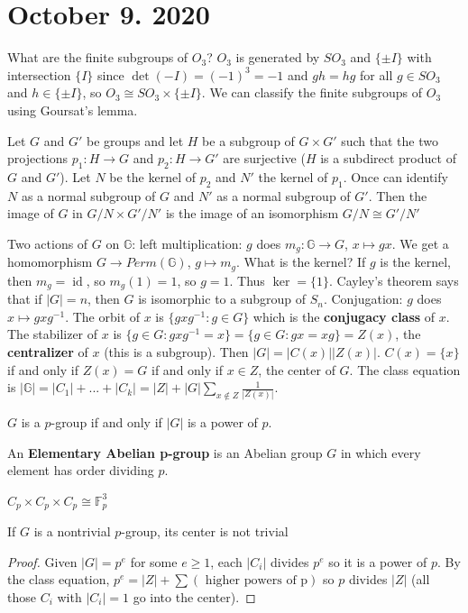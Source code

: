 \documentclass{article}
\newcommand{\vocab}[1]{\textbf{\color{blue!90}\boldmath #1}}
\newcommand{\ra}[1][]{\xrightarrow{#1}}
\DeclareMathOperator{\id}{id}
\begin{document}
\section{October 9. 2020}
What are the finite subgroups of $O_3$? $O_3$ is generated by $SO_3$ and $\{\pm I\}$ with intersection $\{I\}$ since $\det(-I)=(-1)^3=-1$ and $gh=hg$ for all $g\in SO_3$ and $h\in\{\pm I\}$, so $O_3\cong SO_3\times \{\pm I\}$. We can classify the finite subgroups of $O_3$ using Goursat's lemma.
\begin{lemma}
Let $G$ and $G'$ be groups and let $H$ be a subgroup of $G\times G'$ such that the two projections $p_1:H\ra G$ and $p_2:H\ra G'$ are surjective ($H$ is a subdirect product of $G$ and $G'$). Let $N$ be the kernel of $p_2$ and $N'$ the kernel of $p_1$. Once can identify $N$ as a normal subgroup of $G$ and $N'$ as a normal subgroup of $G'$. Then the image of $G$ in $G/N\times G'/N'$ is the image of an isomorphism $G/N\cong G'/N'$ 
\end{lemma}
Two actions of $G$ on $\mathbb{G}$: left multiplication: $g$ does $m_g:\mathbb{G}\ra G$, $x\mapsto gx$. We get a homomorphism $G\ra Perm(\mathbb{G})$, $g\mapsto m_g$. What is the kernel? If $g$ is the kernel, then $m_g=\id$, so $m_g(1)=1$, so $g=1$. Thus $\ker=\{1\}$. Cayley's theorem says that if $|G|=n$, then $G$ is isomorphic to a subgroup of $S_n$. Conjugation: $g$ does $x\mapsto gxg^{-1}$. The orbit of $x$ is $\{gxg^{-1}:g\in G\}$ which is the \vocab{conjugacy class} of $x$. The stabilizer of $x$ is $\{g\in G:gxg^{-1}=x\}=\{g\in G:gx=xg\}=Z(x)$, the \vocab{centralizer} of $x$ (this is a subgroup). Then $|G|=|C(x)||Z(x)|$. $C(x)=\{x\}$ if and only if $Z(x)=G$ if and only if $x\in Z$, the center of $G$. The class equation is $|\mathbb{G}|=|C_1|+...+|C_k|=|Z|+|G|\sum_{x\notin Z}\frac{1}{|Z(x)|}$.
\begin{definition}
$G$ is a $p$-group if and only if $|G|$ is a power of $p$.
\end{definition}
\begin{definition}
An \vocab{Elementary Abelian p-group} is an Abelian group $G$ in which every element has order dividing $p$.
\end{definition}
\begin{example}
$C_p\times C_p\times C_p\cong \mathbb{F}_p^3$
\end{example}
\begin{proposition}
If $G$ is a nontrivial $p$-group, its center is not trivial
\end{proposition}
\begin{proof}
Given $|G|=p^e$ for some $e\geq 1$, each $|C_i|$ divides $p^e$ so it is a power of $p$. By the class equation, $p^e=|Z|+\sum(\textrm{ higher powers of p})$ so $p$ divides $|Z|$ (all those $C_i$ with $|C_i|=1$ go into the center). 
\end{proof}
\end{document}
